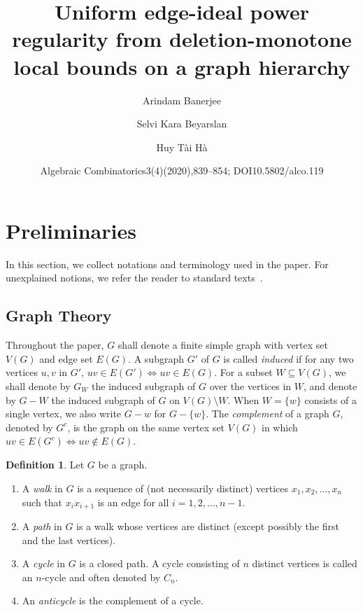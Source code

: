 \documentclass[10pt]{amsart}
\title[Uniform regularity bounds from local graph data]{Uniform edge-ideal power regularity from deletion-monotone local bounds on a graph hierarchy}
\author{Arindam Banerjee}
\author{Selvi Kara Beyarslan}
\author{Huy T\`ai H\`a}
\date{Algebraic Combinatorics3(4)(2020),839–854; DOI10.5802/alco.119}
\theoremstyle{definition}
\newtheorem{defi}[theo]{Definition}
\begin{document}
\maketitle
\setcounter{section}{1}
\section{Preliminaries}\label{chapter2}

In this section, we collect notations and terminology used in the paper. For unexplained notions, we refer the reader to standard texts~\cite{BrHe, E, Harary, HH, MS, Stanley, V}.

\subsection{Graph Theory} 
Throughout the paper, $G$ shall denote a finite simple graph with vertex set $V(G)$ and edge set $E(G)$. A subgraph $G'$ of $G$ is called \emph{induced} if for any two vertices $u,v$ in $G'$, $uv \in E(G') \Leftrightarrow uv \in E(G)$. For a subset $W \subseteq V(G)$, we shall denote by $G_W$ the induced subgraph of $G$ over the vertices in $W$, and denote by $G-W$ the induced subgraph of $G$ on $V(G) \setminus W$. When $W = \{w\}$ consists of a single vertex, we also write $G-w$ for $G-\{w\}$. The \emph{complement} of a graph $G$, denoted by $G^c$, is the graph on the same vertex set $V(G)$ in which $uv \in E(G^c) \Leftrightarrow uv \not\in E(G)$.


\begin{defi} Let $G$ be a graph.
\begin{enumerate}
\item\label{def2.1_1} A \emph{walk} in $G$ is a sequence of (not necessarily distinct) vertices $x_1,x_2, \dots, x_n$ such that $x_ix_{i+1}$ is an edge for all $i=1,2,\dots,n-1.$
\item\label{def2.1_2} A \emph{path} in $G$ is a walk whose vertices are distinct (except possibly the first and the last vertices).
\item\label{def2.1_3} A \emph{cycle} in $G$ is a closed path. A cycle consisting of $n$ distinct vertices is called an $n$-cycle and often denoted by $C_n.$
\item\label{def2.1_4} An \emph{anticycle} is the complement of a cycle.
\end{enumerate}
\end{defi}
\end{document}
